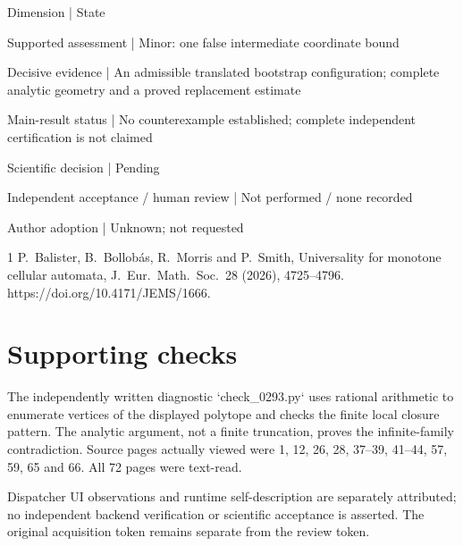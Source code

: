 \documentclass[10pt]{article}
\begin{document}
Dimension | State\par
Supported assessment | Minor: one false intermediate coordinate bound\par
Decisive evidence | An admissible translated bootstrap configuration; complete analytic geometry and a proved replacement estimate\par
Main-result status | No counterexample established; complete independent certification is not claimed\par
Scientific decision | Pending\par
Independent acceptance / human review | Not performed / none recorded\par
Author adoption | Unknown; not requested\par
1 P. Balister, B. Bollobás, R. Morris and P. Smith, Universality for monotone cellular automata, J. Eur. Math. Soc. 28 (2026), 4725–4796. https://doi.org/10.4171/JEMS/1666.\par
\section*{Supporting checks}
The independently written diagnostic `check\_0293.py` uses rational arithmetic to enumerate vertices of the displayed polytope and checks the finite local closure pattern. The analytic argument, not a finite truncation, proves the infinite-family contradiction. Source pages actually viewed were 1, 12, 26, 28, 37–39, 41–44, 57, 59, 65 and 66. All 72 pages were text-read.\par
Dispatcher UI observations and runtime self-description are separately attributed; no independent backend verification or scientific acceptance is asserted. The original acquisition token remains separate from the review token.\par
\end{document}
